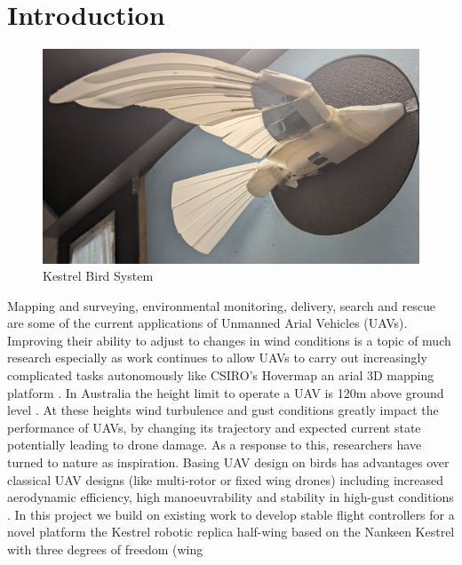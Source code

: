 \section{Introduction}


    \setlength{\intextsep}{0pt}
    \begin{figure}
        \includegraphics[width=\textwidth/2]{./Resources/Kestrel.jpg}
        \caption{\label{fig:figure 1} Kestrel Bird System}
    \end{figure}
    Mapping and surveying, environmental monitoring, delivery, search and
    rescue are some of the current applications of Unmanned Arial Vehicles
    (UAVs). Improving their ability to adjust to changes in wind conditions
    is a topic of much research \cite{1} especially as work continues to
    allow UAVs to carry out increasingly complicated tasks autonomously
    like CSIRO’s Hovermap an arial 3D mapping platform \cite{2}.
    \vspace{\baselineskip}
    In Australia the height limit to operate a UAV is 120m above ground
    level \cite{3}. At these heights wind turbulence and gust conditions greatly
    impact the performance of UAVs, by changing its trajectory and expected
    current state potentially leading to drone damage. As a response to
    this, researchers have turned to nature as inspiration. Basing UAV
    design on birds has advantages over classical UAV designs (like
    multi-rotor or fixed wing drones) including increased aerodynamic
    efficiency, high manoeuvrability and stability in high-gust conditions
    \cite{4}.
    \vspace{\baselineskip}
    In this project we build on existing work to develop stable flight
    controllers for a novel platform the Kestrel robotic replica half-wing
    based on the Nankeen Kestrel with three degrees of freedom (wing

